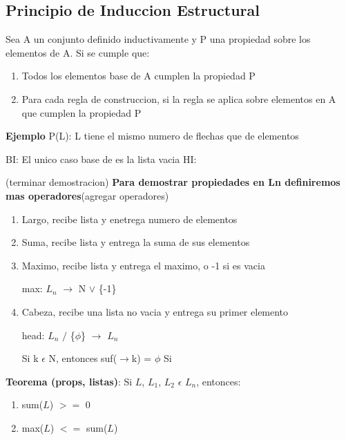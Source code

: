 \documentclass{article}
\begin{document}
        \subsection{Principio de Induccion Estructural}
        Sea A un conjunto definido inductivamente y P una propiedad sobre los elementos de A.
        Si se cumple que:
        \begin{enumerate}
            \item Todos los elementos base de A cumplen la propiedad P
            \item Para cada regla de construccion, si la regla se aplica sobre elementos
            en A que cumplen la propiedad P 
        \end{enumerate}
        \textbf{Ejemplo}
        P(L): L tiene el mismo numero de flechas que de elementos
        \begin{center}
            BI: El unico caso base de es la lista vacia
            \newline
            HI:
        \end{center}(terminar demostracion)
        \newline
        \textbf{Para demostrar propiedades en Ln definiremos mas operadores}(agregar operadores)
        \begin{enumerate}
            \item Largo, recibe lista y enetrega numero de elementos
            \item Suma, recibe lista y entrega la suma de sus elementos
            \item Maximo, recibe lista y entrega el maximo, o -1 si es vacia \begin{center}
                max: $L_{n}$ $\rightarrow$ N $\vee$ \{-1\}
            \end{center}
            \item Cabeza, recibe una lista no vacia y entrega su primer elemento \begin{center}
                head: $L_{n}$ $/$ \{$\phi$\} $\rightarrow$ $L_{n}$ 
            \end{center}
            Si k $\epsilon$ N, entonces suf($\rightarrow$k) = $\phi$ \newline
            Si 
        \end{enumerate}
        \textbf{Teorema (props, listas)}: Si $L$, $L_{1}$, $L_{2}$ $\epsilon$ $L_{n}$, entonces:
        \begin{enumerate}
            \item sum($L$) $>=$ 0
            \item max($L$) $<=$ sum($L$)
        \end{enumerate}
\end{document}
